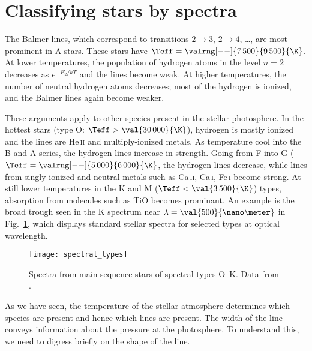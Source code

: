 \section{Classifying stars by spectra}

The Balmer lines, which correspond to transitions $2\to3$, $2\to 4$, \ldots, are most prominent in A stars. These stars have $\Teff = \valrng[--]{7\,500}{9\,500}{\K}$. At lower temperatures, the population of hydrogen atoms in the level $n=2$ decreases as $e^{-E_{2}/kT}$ and the lines become weak. At higher temperatures, the number of neutral hydrogen atoms decreases; most of the hydrogen is ionized, and the Balmer lines again become weaker.

These arguments apply to other species present in the stellar photosphere.  In the hottest stars (type O: $\Teff > \val{30\,000}{\K}$), hydrogen is mostly ionized and the lines are He\,\textsc{ii} and multiply-ionized metals. As temperature cool into the B and A series, the hydrogen lines increase in strength. Going from F into G ($\Teff = \valrng[--]{5\,000}{6\,000}{\K}$, the hydrogen lines decrease, while lines from singly-ionized and neutral metals such as Ca\,\textsc{ii}, Ca\,\textsc{i}, Fe\,\textsc{i} become strong.  At still lower temperatures in the K and M ($\Teff < \val{3\,500}{\K}$) types, absorption from molecules such as TiO becomes prominant.  An example is the broad trough seen in the K spectrum near $\lambda = \val{500}{\nano\meter}$ in Fig.~\ref{f.spectral-types}, which displays standard stellar spectra for selected types at optical wavelength.

\begin{figure}[hbp]
\texttt{[image: spectral\_types]}
\caption[Standard stellar types]{\label{f.spectral-types} Spectra from main-sequence stars of spectral types O--K. Data from \protect\citet{Jacoby1984A-library-of-st}.}
\end{figure}

As we have seen, the temperature of the stellar atmosphere determines which species are present and hence which lines are present. The width of the line conveys information about the pressure at the photosphere. To understand this, we need to digress briefly on the shape of the line.

